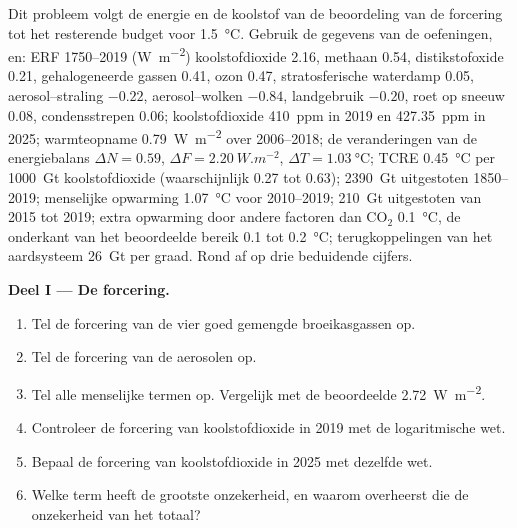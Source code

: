 \begin{problem}\label{pb:b2:anthropogenic-climate-change:1}
Dit probleem volgt de energie en de koolstof van de beoordeling van de forcering tot het resterende
budget voor \qty{1.5}{\celsius}. Gebruik de gegevens van de oefeningen, en: ERF 1750--2019 (\unit{W.m^{-2}})
koolstofdioxide 2.16, methaan 0.54, distikstofoxide 0.21, gehalogeneerde gassen 0.41, ozon 0.47,
stratosferische waterdamp 0.05, aerosol--straling $-0.22$, aerosol--wolken $-0.84$, landgebruik
$-0.20$, roet op sneeuw 0.08, condensstrepen 0.06; koolstofdioxide \qty{410}{ppm} in 2019 en
\qty{427.35}{ppm} in 2025; warmteopname \qty{0.79}{W.m^{-2}} over 2006--2018; de veranderingen van de energiebalans
$\Delta N = 0.59$, $\Delta F = \qty{2.20}{W.m^{-2}}$, $\Delta T = \qty{1.03}{\celsius}$; TCRE
\qty{0.45}{\celsius} per \qty{1000}{Gt} koolstofdioxide (waarschijnlijk 0.27 tot 0.63); \qty{2390}{Gt}
uitgestoten 1850--2019; menselijke opwarming \qty{1.07}{\celsius} voor 2010--2019; \qty{210}{Gt} uitgestoten van
2015 tot 2019; extra opwarming door andere factoren dan CO$_2$ \qty{0.1}{\celsius}, de onderkant van het beoordeelde bereik 0.1
tot \qty{0.2}{\celsius}; terugkoppelingen van het aardsysteem \qty{26}{Gt} per graad. Rond af op drie beduidende
cijfers.

\noindent\textbf{Deel I --- De forcering.}
\begin{enumerate}
  \item Tel de forcering van de vier goed gemengde broeikasgassen op.
  \item Tel de forcering van de aerosolen op.
  \item Tel alle menselijke termen op. Vergelijk met de beoordeelde \qty{2.72}{W.m^{-2}}.
  \item Controleer de forcering van koolstofdioxide in 2019 met de logaritmische wet.
  \item Bepaal de forcering van koolstofdioxide in 2025 met dezelfde wet.
  \item Welke term heeft de grootste onzekerheid, en waarom overheerst die de onzekerheid van het totaal?
\end{enumerate}


\end{problem}
